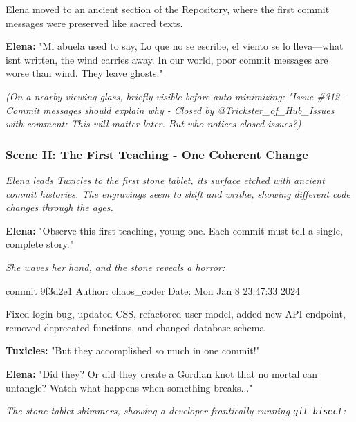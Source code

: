 Elena moved to an ancient section of the Repository, where the first commit messages were preserved like sacred texts.

\textbf{Elena:} "Mi abuela used to say, \textquotesingle Lo que no se escribe, el viento se lo lleva\textquotesingle---what isn\textquotesingle t written, the wind carries away. In our world, poor commit messages are worse than wind. They leave ghosts."

\emph{(On a nearby viewing glass, briefly visible before auto-minimizing: "Issue \#312 - \textquotesingle Commit messages should explain why\textquotesingle{} - Closed by @Trickster\_of\_Hub\_Issues with comment: \textquotesingle This will matter later.\textquotesingle{} But who notices closed issues?)}

\bookdivider

\subsubsection{Scene II: The First Teaching - One Coherent Change}\label{scene-ii-the-first-teaching---one-coherent-change}

\emph{Elena leads Tuxicles to the first stone tablet, its surface etched with ancient commit histories. The engravings seem to shift and writhe, showing different code changes through the ages.}

\textbf{Elena:} "Observe this first teaching, young one. Each commit must tell a single, complete story."

\emph{She waves her hand, and the stone reveals a horror:}

\begin{codeblock}
commit 9f3d2e1
Author: chaos_coder
Date: Mon Jan 8 23:47:33 2024

Fixed login bug, updated CSS, refactored user model, 
added new API endpoint, removed deprecated functions,
and changed database schema
\end{codeblock}

\textbf{Tuxicles:} "But they accomplished so much in one commit!"

\textbf{Elena:} "Did they? Or did they create a Gordian knot that no mortal can untangle? Watch what happens when something breaks..."

\emph{The stone tablet shimmers, showing a developer frantically running \texttt{git\ bisect}:}


